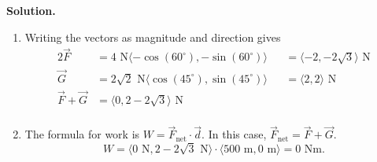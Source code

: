 \documentclass[12 pt]{article}
\begin{document}
\begin{enumerate}
\begin{enumerate}
		\end{enumerate}
    \textbf{Solution.}
    \begin{enumerate}
      \item Writing the vectors as magnitude and direction gives \begin{alignat*}{2}
        \vec{F}
          &= 4\text{ N}\langle-\cos(60^\circ), -\sin(60^\circ)\rangle
          &&= \langle -2, -2\sqrt 3 \rangle\text{ N} \\
        \vec{G}
          &= 2\sqrt 2\text{ N}\langle\cos(45^\circ), \sin(45^\circ)\rangle
          &&= \langle 2, 2 \rangle\text{ N} \\
        \vec{F} + \vec{G}
          &= \langle 0, 2-2\sqrt 3\rangle\text{ N} \\
      \end{alignat*}
      \item The formula for work is $W = \vec F_\text{net} \cdot \vec d$. In this case, $\vec F_\text{net} = \vec{F} + \vec{G}$. \[
        W =
        \langle 0  \text{ N}, 2-2\sqrt3\text{ N}\rangle \cdot
        \langle 500\text{ m}, 0        \text{ m}\rangle
        = 0 \text{ Nm}.
      \]
    \end{enumerate}
  \end{enumerate}
\end{document}
